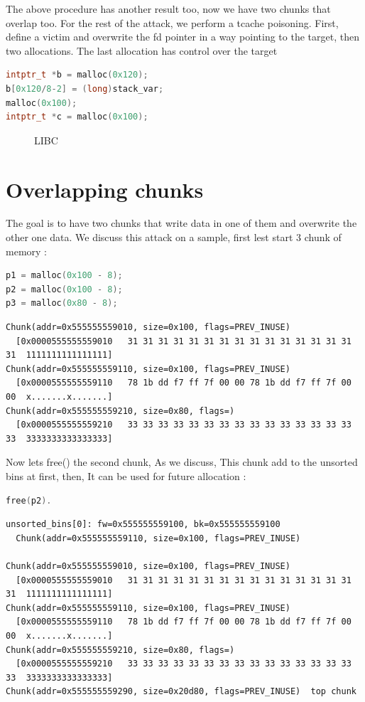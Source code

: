 \documentclass{masterthesis}
\newcommand*\tch{tcache}
\newcommand*\ub{unsorted bins}
\begin{document}
The above procedure has another result too, now we have two chunks that overlap too. For the rest of the attack, we perform a \tch{} poisoning. First, define a victim and overwrite the fd pointer in a way pointing to the target, then two allocations. The last allocation has control over the target

\begin{lstlisting}[language=c,frame=tlrb]
intptr_t *b = malloc(0x120);
b[0x120/8-2] = (long)stack_var;
malloc(0x100);
intptr_t *c = malloc(0x100);
\end{lstlisting}

 \begin{figure}[h!]
  \caption{LIBC}
\end{figure}


\section{ Overlapping chunks}
The goal is to have two chunks that write data in one of them and overwrite the other one data. We discuss this attack on a sample, first lest start 3 chunk of memory :
\begin{lstlisting}[language=c,frame=tlrb]
p1 = malloc(0x100 - 8);
p2 = malloc(0x100 - 8);
p3 = malloc(0x80 - 8);
\end{lstlisting}
\begin{lstlisting}[frame=tlrb]
Chunk(addr=0x555555559010, size=0x100, flags=PREV_INUSE)
  [0x0000555555559010   31 31 31 31 31 31 31 31 31 31 31 31 31 31 31 31  1111111111111111]
Chunk(addr=0x555555559110, size=0x100, flags=PREV_INUSE)
  [0x0000555555559110   78 1b dd f7 ff 7f 00 00 78 1b dd f7 ff 7f 00 00  x.......x.......]
Chunk(addr=0x555555559210, size=0x80, flags=)
  [0x0000555555559210   33 33 33 33 33 33 33 33 33 33 33 33 33 33 33 33  3333333333333333]
\end{lstlisting}

Now lets free() the second chunk, As we discuss, This chunk add to the \ub{} at first, then, It can be used for future allocation :
\begin{lstlisting}[language=c,frame=tlrb]
free(p2).
\end{lstlisting}

\begin{lstlisting}[frame=tlrb]
unsorted_bins[0]: fw=0x555555559100, bk=0x555555559100
  Chunk(addr=0x555555559110, size=0x100, flags=PREV_INUSE)

Chunk(addr=0x555555559010, size=0x100, flags=PREV_INUSE)
  [0x0000555555559010   31 31 31 31 31 31 31 31 31 31 31 31 31 31 31 31  1111111111111111]
Chunk(addr=0x555555559110, size=0x100, flags=PREV_INUSE)
  [0x0000555555559110   78 1b dd f7 ff 7f 00 00 78 1b dd f7 ff 7f 00 00  x.......x.......]
Chunk(addr=0x555555559210, size=0x80, flags=)
  [0x0000555555559210   33 33 33 33 33 33 33 33 33 33 33 33 33 33 33 33  3333333333333333]
Chunk(addr=0x555555559290, size=0x20d80, flags=PREV_INUSE)  top chunk
\end{lstlisting}
\end{document}
